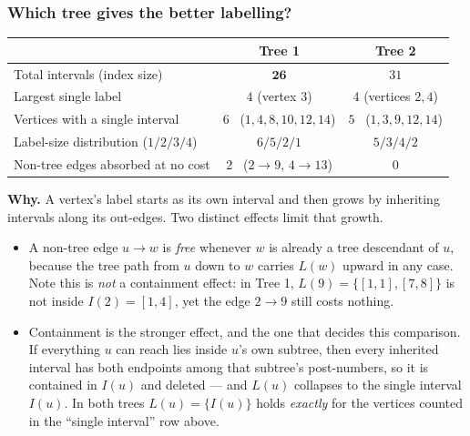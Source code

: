 \documentclass[11pt]{article}
\begin{document}
\noindent\begin{minipage}{\linewidth}
\subsubsection*{Which tree gives the better labelling?}

\begin{center}
\begin{tabular}{l c c}
\toprule
\rowcolor{white}
 & \textbf{Tree 1} & \textbf{Tree 2} \\
\midrule
Total intervals (index size) & $\mathbf{26}$ & $31$ \\
Largest single label & $4$ (vertex $3$) & $4$ (vertices $2,4$) \\
Vertices with a single interval & $6$ \ ($1,4,8,10,12,14$) & $5$ \ ($1,3,9,12,14$) \\
Label-size distribution ($1/2/3/4$) & $6/5/2/1$ & $5/3/4/2$ \\
Non-tree edges absorbed at no cost & $2$ \ ($2\to 9$, $4\to 13$) & $0$ \\
\bottomrule
\end{tabular}
\end{center}
\end{minipage}

\noindent\textbf{\color{accent!85!black}Why.} A vertex's label starts as its own interval
and then grows by inheriting intervals along its out-edges. Two distinct effects limit that
growth.

\begin{itemize}[nosep,leftmargin=1.3em]
  \item A non-tree edge $u\to w$ is \emph{free} whenever $w$ is already a tree descendant
    of $u$, because the tree path from $u$ down to $w$ carries $L(w)$ upward in any case.
    Note this is \emph{not} a containment effect: in Tree 1, $L(9)=\{[1,1],[7,8]\}$ is not
    inside $I(2)=[1,4]$, yet the edge $2\to 9$ still costs nothing.
  \item Containment is the stronger effect, and the one that decides this comparison. If
    everything $u$ can reach lies inside $u$'s own subtree, then every inherited interval
    has both endpoints among that subtree's post-numbers, so it is contained in $I(u)$ and
    deleted --- and $L(u)$ collapses to the single interval $I(u)$. In both trees
    $L(u)=\{I(u)\}$ holds \emph{exactly} for the vertices counted in the
    ``single interval'' row above.
\end{itemize}
\end{document}
